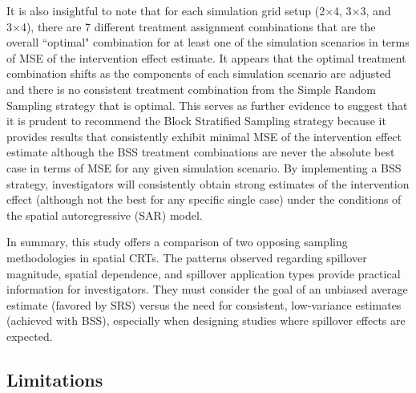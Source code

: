 \documentclass{article}[11pt]
\begin{document}
It is also insightful to note that for each simulation grid setup (2×4, 3×3, and 3×4), there are 7 different treatment assignment combinations that are the overall ``optimal" combination for at least one of the simulation scenarios in terms of MSE of the intervention effect estimate. It appears that the optimal treatment combination shifts as the components of each simulation scenario are adjusted and there is no consistent treatment combination from the Simple Random Sampling strategy that is optimal. This serves as further evidence to suggest that it is prudent to recommend the Block Stratified Sampling strategy because it provides results that consistently exhibit minimal MSE of the intervention effect estimate although the BSS treatment combinations are never the absolute best case in terms of MSE for any given simulation scenario. By implementing a BSS strategy, investigators will consistently obtain strong estimates of the intervention effect (although not the best for any specific single case) under the conditions of the spatial autoregressive (SAR) model.

In summary, this study offers a comparison of two opposing sampling methodologies in spatial CRTs. The patterns observed regarding spillover magnitude, spatial dependence, and spillover application types provide practical information for investigators. They must consider the goal of an unbiased average estimate (favored by SRS) versus the need for consistent, low-variance estimates (achieved with BSS), especially when designing studies where spillover effects are expected.

\subsection{Limitations}
\end{document}
